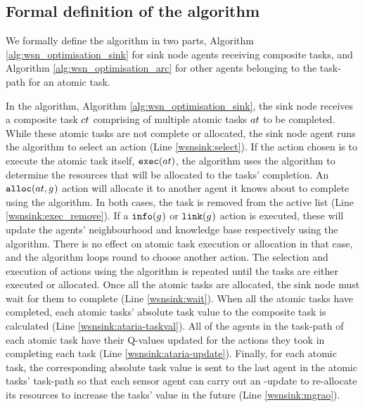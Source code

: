 \subsection{Formal definition of the \acronymWSNOptimisation{}{} algorithm}
\label{section:solution_formal}

We formally define the \acronymWSNOptimisation{}{} algorithm in two parts, Algorithm \ref{alg:wsn_optimisation_sink} for sink node agents receiving composite tasks, and Algorithm \ref{alg:wsn_optimisation_arc} for other agents belonging to the task-path for an atomic task.

In the \acronymWSNOptimisationSink{}{} algorithm, Algorithm \ref{alg:wsn_optimisation_sink}, the sink node receives a composite task $\varCompositeTask{}{}$ comprising of multiple atomic tasks $\varAtomicTask{}{}$ to be completed. While these atomic tasks are not complete or allocated, the sink node agent runs the \acronymATARIA{}{} algorithm to select an action (Line \ref{wsnsink:select}).  If the action chosen is to execute the atomic task itself, $\functionExec{}{}$, the algorithm uses the \acronymMGRAO{}{} algorithm to determine the resources that will be allocated to the tasks' completion. An $\functionAlloc{}{}$ action will allocate it to another agent it knows about to complete using the \acronymWSNOptimisationArc{}{} algorithm. In both cases, the task is removed from the active list  (Line \ref{wsnsink:exec_remove}). If a $\functionInfo{}{}$ or $\functionLink{}{}$ action is executed, these will update the agents' neighbourhood and knowledge base respectively using the \acronymATARIA{}{} algorithm. There is no effect on atomic task execution or allocation in that case, and the algorithm loops round to choose another action. The selection and execution of actions using the \acronymATARIA{}{} algorithm is repeated until the tasks are either executed or allocated. Once all the atomic tasks are allocated, the sink node must wait for them to complete (Line \ref{wsnsink:wait}). When all the atomic tasks have completed, each atomic tasks' absolute task value to the composite task is calculated (Line \ref{wsnsink:ataria-taskval}). All of the agents in the task-path of each atomic task have their Q-values updated for the actions they took in completing each task (Line \ref{wsnsink:ataria-update}). Finally, for each atomic task, the corresponding absolute task value is sent to the last agent in the atomic tasks' task-path so that each sensor agent can carry out an \acronymMGRAO{}{}-update to re-allocate its resources to increase the tasks' value in the future (Line \ref{wsnsink:mgrao}). 

